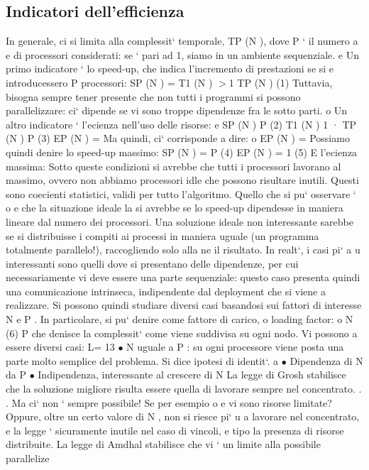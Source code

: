 \documentclass[a4paper,12pt]{article}
\begin{document}
\subsection{Indicatori dell'efficienza}
In generale, ci si limita alla complessit` temporale, TP (N ), dove P ` il numero
a
e
di processori considerati: se ` pari ad 1, siamo in un ambiente sequenziale.
e
Un primo indicatore ` lo speed-up, che indica l'incremento di prestazioni se si
e
introducessero P processori:
SP (N ) =
T1 (N )
$>$1
TP (N )
(1)
Tuttavia, bisogna sempre tener presente che non tutti i programmi si possono
parallelizzare: ci` dipende se vi sono troppe dipendenze fra le sotto parti.
o
Un altro indicatore ` l'ecienza nell'uso delle risorse:
e
SP (N )
P
(2)
T1 (N ) 1
·
TP (N ) P
(3)
EP (N ) =
Ma quindi, ci` corrisponde a dire:
o
EP (N ) =
Possiamo quindi denire lo speed-up massimo:
SP (N ) = P
(4)
EP (N ) = 1
(5)
E l'ecienza massima:
Sotto queste condizioni si avrebbe che tutti i processori lavorano al massimo,
ovvero non abbiamo processori idle che possono risultare inutili. Questi sono
coecienti statistici, validi per tutto l'algoritmo. Quello che si pu` osservare `
o
e
che la situazione ideale la si avrebbe se lo speed-up dipendesse in maniera lineare dal numero dei processori. Una
soluzione ideale non interessante sarebbe
se si distribuisse i compiti ai processi in maniera uguale (un programma totalmente parallelo!), raccogliendo solo alla
ne il risultato. In realt`, i casi pi`
a
u
interessanti sono quelli dove si presentano delle dipendenze, per cui necessariamente vi deve essere una parte
sequenziale: questo caso presenta quindi una
comunicazione intrinseca, indipendente dal deployment che si viene a realizzare.
Si possono quindi studiare diversi casi basandosi sui fattori di interesse N e
P . In particolare, si pu` denire come fattore di carico, o loading factor:
o
N
(6)
P
che denisce la complessit` come viene suddivisa su ogni nodo. Vi possono
a
essere diversi casi:
L=
13
\newpage
$\bullet$ N uguale a P : su ogni processore viene posta una parte molto semplice
del problema. Si dice ipotesi di identit`.
a
$\bullet$ Dipendenza di N da P
$\bullet$ Indipendenza, interessante al crescere di N
La legge di Grosh stabilisce che la soluzione migliore risulta essere quella di lavorare sempre nel concentrato. . . Ma
ci` non ` sempre possibile! Se per esempio
o
e
vi sono risorse limitate? Oppure, oltre un certo valore di N , non si riesce pi`
u
a lavorare nel concentrato, e la legge ` sicuramente inutile nel caso di vincoli,
e
tipo la presenza di risorse distribuite.
La legge di Amdhal stabilisce che vi ` un limite alla possibile parallelize
\end{document}

